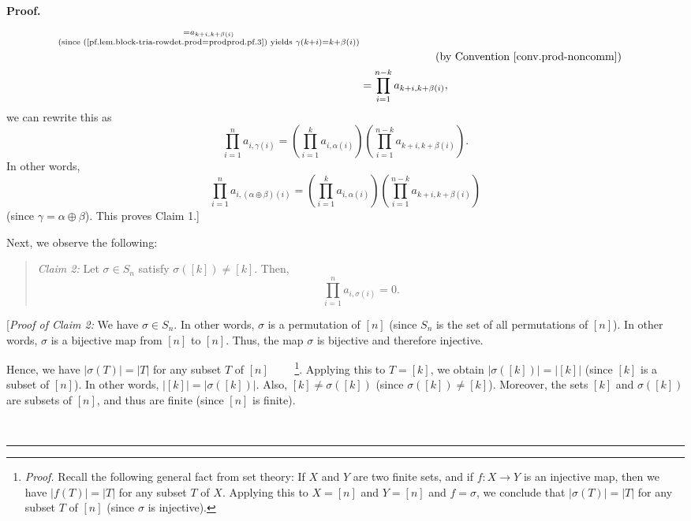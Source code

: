 \documentclass[numbers=enddot,12pt,final,onecolumn,notitlepage,english]{scrartcl}%
\theoremstyle{definition}
\newenvironment{statement}{\begin{quote}}{\end{quote}}
\newenvironment{proof}[1][Proof]{\noindent\textbf{#1.} }{\ \rule{0.5em}{0.5em}}
\let\prodnonlimits\prod
\renewcommand{\prod}{\prodnonlimits\limits}
\newenvironment{verlong}{}{}
\begin{document}
\begin{verlong}
\begin{proof}
\begin{align*}
{}_{\substack{=a_{k+i,k+\beta\left(  i\right)  }\\\text{(since
(\ref{pf.lem.block-tria-rowdet.prod=prodprod.pf.3}) yields }\gamma\left(
k+i\right)  =k+\beta\left(  i\right)  \text{)}}}\\
&  \ \ \ \ \ \ \ \ \ \ \ \ \ \ \ \ \ \ \ \ \left(  \text{by Convention
\ref{conv.prod-noncomm}}\right) \\
&  =\prod_{i=1}^{n-k}a_{k+i,k+\beta\left(  i\right)  },
\end{align*}
we can rewrite this as
\[
\prod_{i=1}^{n}a_{i,\gamma\left(  i\right)  }=\left(  \prod_{i=1}%
^{k}a_{i,\alpha\left(  i\right)  }\right)  \left(  \prod_{i=1}^{n-k}%
a_{k+i,k+\beta\left(  i\right)  }\right)  .
\]
In other words,%
\[
\prod_{i=1}^{n}a_{i,\left(  \alpha\oplus\beta\right)  \left(  i\right)
}=\left(  \prod_{i=1}^{k}a_{i,\alpha\left(  i\right)  }\right)  \left(
\prod_{i=1}^{n-k}a_{k+i,k+\beta\left(  i\right)  }\right)
\]
(since $\gamma=\alpha\oplus\beta$). This proves Claim 1.] \medskip

Next, we observe the following:

\begin{statement}
\textit{Claim 2:} Let $\sigma\in S_{n}$ satisfy $\sigma\left(  \left[
k\right]  \right)  \neq\left[  k\right]  $. Then,
\[
\prod_{i=1}^{n}a_{i,\sigma\left(  i\right)  }=0.
\]

\end{statement}

[\textit{Proof of Claim 2:} We have $\sigma\in S_{n}$. In other words,
$\sigma$ is a permutation of $\left[  n\right]  $ (since $S_{n}$ is the set of
all permutations of $\left[  n\right]  $). In other words, $\sigma$ is a
bijective map from $\left[  n\right]  $ to $\left[  n\right]  $. Thus, the map
$\sigma$ is bijective and therefore injective.

Hence, we have $\left\vert \sigma\left(  T\right)  \right\vert =\left\vert
T\right\vert $ for any subset $T$ of $\left[  n\right]  $%
\ \ \ \ \footnote{\textit{Proof.} Recall the following general fact from set
theory: If $X$ and $Y$ are two finite sets, and if $f:X\rightarrow Y$ is an
injective map, then we have $\left\vert f\left(  T\right)  \right\vert
=\left\vert T\right\vert $ for any subset $T$ of $X$. Applying this to
$X=\left[  n\right]  $ and $Y=\left[  n\right]  $ and $f=\sigma$, we conclude
that $\left\vert \sigma\left(  T\right)  \right\vert =\left\vert T\right\vert
$ for any subset $T$ of $\left[  n\right]  $ (since $\sigma$ is injective).}.
Applying this to $T=\left[  k\right]  $, we obtain $\left\vert \sigma\left(
\left[  k\right]  \right)  \right\vert =\left\vert \left[  k\right]
\right\vert $ (since $\left[  k\right]  $ is a subset of $\left[  n\right]
$). In other words, $\left\vert \left[  k\right]  \right\vert =\left\vert
\sigma\left(  \left[  k\right]  \right)  \right\vert $. Also, $\left[
k\right]  \neq\sigma\left(  \left[  k\right]  \right)  $ (since $\sigma\left(
\left[  k\right]  \right)  \neq\left[  k\right]  $). Moreover, the sets
$\left[  k\right]  $ and $\sigma\left(  \left[  k\right]  \right)  $ are
subsets of $\left[  n\right]  $, and thus are finite (since $\left[  n\right]
$ is finite).


\end{proof}
\end{verlong}
\end{document}
